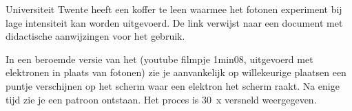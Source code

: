 \documentclass[../../main.tex]{subfiles}
\begin{document}
{Universiteit Twente} heeft een koffer te leen waarmee het fotonen experiment bij lage intensiteit kan worden uitgevoerd. De link verwijst naar een document met  didactische aanwijzingen voor het gebruik.


In een beroemde versie van het  (youtube filmpje 1min08, uitgevoerd met elektronen in plaats van fotonen) zie je aanvankelijk op willekeurige plaatsen een puntje verschijnen op het scherm waar een elektron het scherm raakt. Na enige tijd zie je een patroon ontstaan. Het proces is 30~x versneld weergegeven.
 
\end{document}

